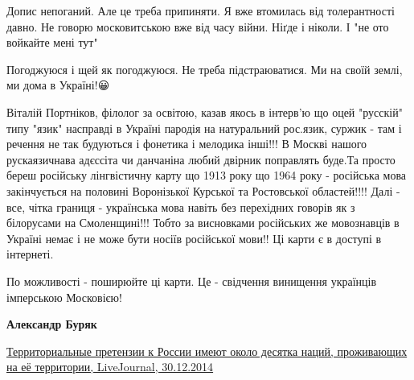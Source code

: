 \begin{itemize}
Допис непоганий. Але це треба припиняти. Я вже втомилась від толерантності
давно. Не говорю московитською вже від часу війни. Ніґде і ніколи. І "не ото
войкайте мені тут"💙💛


 

Погоджуюся і щей як погоджуюся. Не треба підстраюватися. Ми на своїй землі, ми дома в Україні!😀

 

Віталій Портніков, філолог за освітою, казав якось в інтерв'ю що оцей "русскій"
типу "язик" насправді в Україні пародія на натуральний рос.язик, суржик - там і
речення не так будуються і фонетика і мелодика інші!!! В Москві нашого
рускаязичнава адєссіта чи данчаніна любий двірник поправлять буде.Та просто
береш російську лінгвістичну карту що 1913 року що 1964 року - російська мова
закінчується на половині Воронізької Курської та Ростовської областей!!!! Далі
- все, чітка границя - українська мова навіть без перехідних говорів як з
білорусами на Смоленщині!!! Тобто за висновками російських же мовознавців в
Україні немає і не може бути носіїв російської мови!! Ці карти є в доступі в
інтернеті.

\begin{itemize}
 
По можливості - поширюйте ці карти. Це - свідчення винищення українців імперською Московією!

 
\textbf{Александр Буряк} 

\href{https://privacy-ua.livejournal.com/102513.html}{%
Территориальные претензии к России имеют около десятка наций, проживающих на её территории,%
LiveJournal, 30.12.2014
}


\end{itemize}
\end{itemize}
